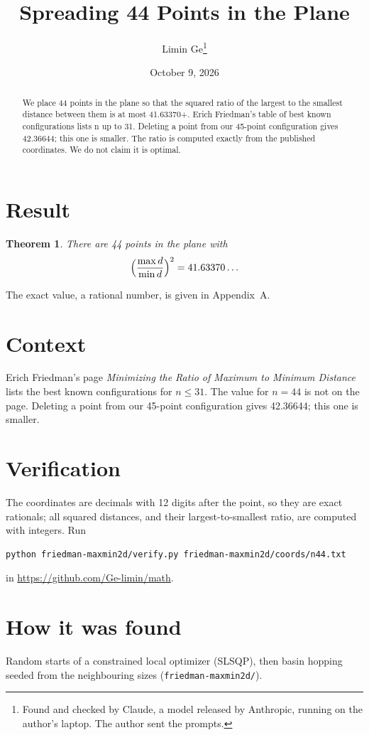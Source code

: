 \documentclass[11pt,a4paper]{article}
\title{Spreading 44 Points in the Plane}
\author{Limin Ge\thanks{Found and checked by Claude, a model released by Anthropic, running on the author's laptop. The author sent the prompts.}}
\date{October 9, 2026}
\newtheorem*{theorem}{Theorem}
\begin{document}
\maketitle
\begin{abstract}
We place 44 points in the plane so that the squared ratio of the largest to the smallest distance between them is at most 41.63370+. Erich Friedman's table of best known configurations lists n up to 31. Deleting a point from our 45-point configuration gives 42.36644; this one is smaller. The ratio is computed exactly from the published coordinates. We do not claim it is optimal.
\end{abstract}

\section{Result}
\begin{theorem}
There are 44 points in the plane with
\[ \Bigl(\frac{\max d}{\min d}\Bigr)^2 = 41.63370\ldots \]
\end{theorem}
The exact value, a rational number, is given in Appendix~A.


\section{Context}
Erich Friedman's page \emph{Minimizing the Ratio of Maximum to Minimum Distance} lists the best known configurations for $n\le 31$. The value for $n=44$ is not on the page. Deleting a point from our 45-point configuration gives 42.36644; this one is smaller.


\section{Verification}
The coordinates are decimals with 12 digits after the point, so they are exact rationals; all squared distances, and their largest-to-smallest ratio, are computed with integers. Run
\begin{verbatim}
python friedman-maxmin2d/verify.py friedman-maxmin2d/coords/n44.txt
\end{verbatim}
in \url{https://github.com/Ge-limin/math}.


\section{How it was found}
Random starts of a constrained local optimizer (SLSQP), then basin hopping seeded from the neighbouring sizes (\texttt{friedman-maxmin2d/}).
\end{document}
